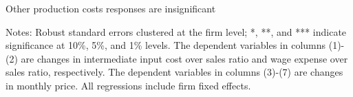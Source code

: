 \documentclass[10pt]{beamer}
\begin{document}
\begin{frame}{Other production costs responses are insignificant}
\begin{table}[htbp]
{\begin{threeparttable}
            \begin{tablenotes}
                \footnotesize
                \item Notes: Robust standard errors clustered at the firm level;  *, **, and *** indicate significance at 10\%, 5\%, and 1\% levels. The dependent variables in columns (1)-(2) are changes in intermediate input cost over sales ratio and wage expense over sales ratio, respectively. The dependent variables in columns (3)-(7) are changes in monthly price. All regressions include firm fixed effects.
    	\end{tablenotes}
        \end{threeparttable}
        }
        \label{tab.other}
    \end{table}
\end{frame}
\end{document}
